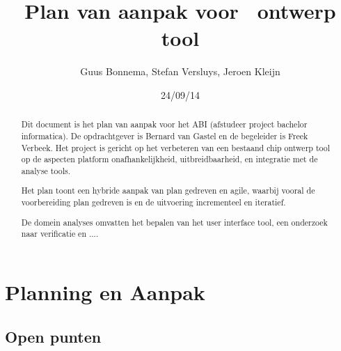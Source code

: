 \documentclass[a4paper,11pt]{article}
\author{Guus Bonnema, Stefan Versluys, Jeroen Kleijn}
\date{24/09/14}
\title{Plan van aanpak voor \xmas\ ontwerp tool}
\begin{document}

\newcommand{\xmas}{x\textsc{mas}}%

\maketitle

\begin{abstract}
 Dit document is het plan van aanpak voor het ABI (afstudeer project bachelor
 informatica). De opdrachtgever is Bernard van Gastel en de begeleider is
 Freek Verbeek. Het project is gericht op het verbeteren van een bestaand
 chip ontwerp tool op de aspecten platform onafhankelijkheid, uitbreidbaarheid,
 en integratie met de analyse tools.

 Het plan toont een hybride aanpak van plan gedreven en agile, waarbij vooral
 de voorbereiding plan gedreven is en de uitvoering incrementeel en iteratief.

 De domein analyses omvatten het bepalen van het user interface tool,
 een onderzoek naar verificatie en ....
\end{abstract}






\section{Planning en Aanpak}




\subsection{Open punten}
\end{document}
